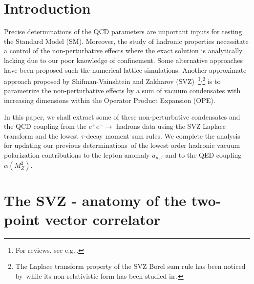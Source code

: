 \documentclass[review]{elsarticle}
\def\nin{\noindent}
\begin{document}
\newpage
\section{Introduction}
\vspace*{-0.2cm}
Precise determinations of the QCD parameters are important inputs for testing the Standard Model (SM). Moreover, 
the study of hadronic properties necessitate a control of the non-perturbative effects where the exact solution is analytically lacking due to our poor knowledge of confinement. Some alternative approaches have been proposed such the numerical lattice simulations. Another approximate approach proposed by Shifman-Vainshtein and Zakharov (SVZ)\,\,\cite{SVZa}\,\footnote{For reviews, see e.g.\,\cite{ZAKA,SNB1,SNB2,SNREV1,SNREV2,SNB3,RRY,DERAF,BERTa,YNDB,PASC,DOSCH,COL}.}$^,$\footnote{The Laplace transform property of the SVZ Borel sum rule has been noticed by\,\cite{SNR} while its non-relativistic form has been studied in\,\cite{BELLa}. }  is to parametrize the non-perturbative effects by a sum of vacuum condensates with increasing dimensions within the Operator Product Expansion (OPE). 

In this paper, we shall extract some of these non-perturbative condensates and the QCD coupling from the $e^+e^-\to$ hadrons data using the SVZ Laplace transform and the lowest $\tau$-decay moment sum rules.  We complete the analysis for updating our previous determinations\,\cite{CALMET,SN76,SN78,SNamu,SNalfa} of the lowest order hadronic vacuum polarization  contributions to the lepton anomaly  $a_{\mu,\tau}$ and to the QED coupling $\alpha(M_Z^2)$.

\section{The SVZ - anatomy of the two-point vector correlator}
\vspace*{-0.2cm}
\end{document}
